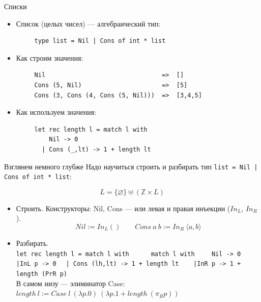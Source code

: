 \documentclass[aspectratio=169]{beamer}
\begin{document}
\begin{frame}[fragile]{Списки}
\begin{itemize}
\item Список (целых чисел) --- алгебраический тип:
\begin{verbatim}
     type list = Nil | Cons of int * list
\end{verbatim}

\item Как строим значения:
\begin{verbatim}
     Nil                                =>  []
     Cons (5, Nil)                      =>  [5]
     Cons (3, Cons (4, Cons (5, Nil)))  =>  [3,4,5]
\end{verbatim}


\item Как используем значения:
\begin{verbatim}
     let rec length l = match l with
         Nil -> 0
       | Cons (_,lt) -> 1 + length lt
\end{verbatim}
\end{itemize}
\end{frame}

\begin{frame}[fragile]{Взглянем немного глубже}
Надо научиться строить и разбирать тип \verb!list = Nil | Cons of int * list!:

$$L = \{\varnothing\} \uplus (\mathbb{Z}\times L)$$

\begin{itemize}
\item Строить. Конструкторы: Nil, Cons --- или левая и правая инъекции ($In_L$, $In_R$).
$$Nil := In_L ()\quad\quad Cons\ a\ b := In_R\ \langle a, b \rangle$$

\item Разбирать.\\
\verb!let rec length l = match l with      !{\color{blue}\verb!match l with!}
\verb!    Nil -> 0                         !{\color{blue}\verb!|InL p -> 0!}
\verb!  | Cons (lh,lt) -> 1 + length lt    !{\color{blue}\verb!|InR p -> 1 + length (PrR p)!}\\\vspace{0.3cm}
В самом низу --- элиминатор Case:
$length\ l := Case\ l\ (\lambda p.0)\ (\lambda p.1 + length\ (\pi_R p))$
\end{itemize}
\end{frame}
\end{document}
